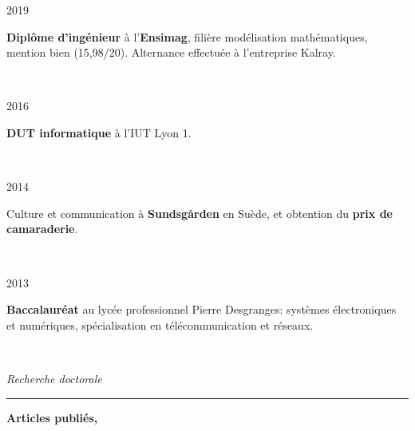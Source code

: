 \documentclass[a4paper,10pt, french]{article}
\begin{document}
\noindent
\begin{minipage}{0.20\textwidth}
	\color{MyGray} 2019
\end{minipage}
\hfill
\begin{minipage}{0.70\textwidth}
	\textbf{Diplôme d'ingénieur} à l'\textbf{Ensimag}, filière modélisation mathématiques, mention bien (15,98/20). Alternance effectuée à l'entreprise Kalray.%
\end{minipage}\\
\vspace{2mm}

\noindent
\begin{minipage}{0.20\textwidth}
	\color{MyGray} 2016
\end{minipage}
\hfill
\begin{minipage}{0.70\textwidth}
	\textbf{DUT informatique} à l'IUT Lyon 1.
\end{minipage}\\
\vspace{2mm}

\noindent
\begin{minipage}{0.20\textwidth}
	\color{MyGray} 2014
\end{minipage}
\hfill
\begin{minipage}{0.70\textwidth}
	Culture et communication à \textbf{Sundsgården} en Suède, et obtention du \textbf{prix de camaraderie}.
\end{minipage}\\
\vspace{2mm}

\noindent
\begin{minipage}{0.20\textwidth}
	\color{MyGray} 2013
\end{minipage}
\hfill
\begin{minipage}{0.70\textwidth}
	\textbf{Baccalauréat} au lycée professionnel Pierre Desgranges: systèmes électroniques et numériques, spécialisation en télécommunication et réseaux.
\end{minipage}\\
\vspace{5mm}

\noindent
\textit{\Large \color{MyGray} \hspace{5mm} Recherche doctorale}
\vspace{2mm}
{\color{DefaultGray}\hrule height .1pt}
\vspace{4mm}

\textbf{Articles publiés,}
\nocite{*}


\vspace{5mm}
\newpage
\end{document}

